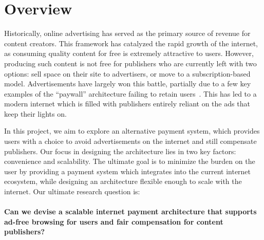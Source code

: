 
\section{Overview}
Historically, online advertising has served as the primary source of revenue for content creators.
This framework has catalyzed the rapid growth of the internet, as consuming quality content for free is extremely attractive to users.
However, producing such content is not free for publishers who are currently left with two options: sell space on their site to advertisers, or move to a subscription-based model.
Advertisements have largely won this battle, partially due to a few key examples of the “paywall” architecture failing to retain users~\cite{nyt}.
This has led to a modern internet which is filled with publishers entirely reliant on the ads that keep their lights on.

In this project, we aim to explore an alternative payment system, which provides users with a choice to avoid advertisements on the internet and still compensate publishers.
Our focus in designing the architecture lies in two key factors: convenience and scalability.
The ultimate goal is to minimize the burden on the user by providing a payment system which integrates into the current internet ecosystem, while designing an architecture flexible enough to scale with the
internet.
Our ultimate research question is: \\
\\
\textbf{Can we devise a scalable internet payment architecture that supports ad-free browsing for users and fair compensation for content publishers?}
